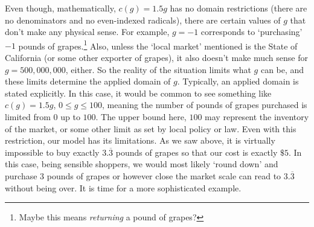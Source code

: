 Even though, mathematically, $c(g) = 1.5g$ has no domain restrictions (there are no denominators and no even-indexed radicals), there are certain values of $g$ that don't make any physical sense.  For example, $g = -1$ corresponds to `purchasing' $-1$ pounds of grapes.\footnote{Maybe this means \textit{returning} a pound of grapes?}  Also, unless the `local market' mentioned is the State of California (or some other exporter of grapes), it also doesn't make much sense for $g = 500,\!000,\!000$, either. So the reality of the situation limits what $g$ can be, and these limits determine the applied domain of $g$.  Typically, an applied domain is stated explicitly.  In this case, it would be common to see something like $c(g) = 1.5g$, $0 \leq g \leq 100$, meaning the number of pounds of grapes purchased is limited from $0$ up to $100$. The upper bound here, $100$ may represent the inventory of the market, or some other limit as set by local policy or law.  Even with this restriction, our model has its limitations.  As we saw above, it is virtually impossible to buy exactly  $3.\overline{3}$ pounds of grapes so that our cost is exactly $\$5$.  In this case, being sensible shoppers, we would most likely `round down' and purchase $3$ pounds of grapes or however close the market scale can read to $3.\overline{3}$ without being over.  It is time for a more sophisticated example.


